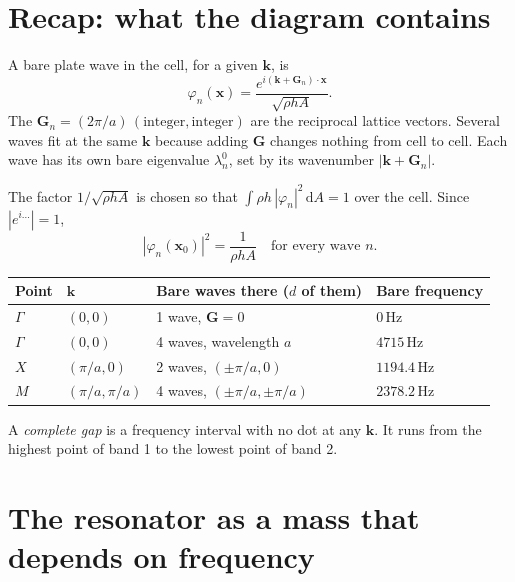\section{Recap: what the diagram contains}

A bare plate wave in the cell, for a given $\mathbf{k}$, is
\begin{equation}
  \varphi_n(\mathbf{x}) = \frac{e^{i(\mathbf{k}+\mathbf{G}_n)\cdot\mathbf{x}}}{\sqrt{\rho h A}} .
\end{equation}
The $\mathbf{G}_n = (2\pi/a)\,(\text{integer}, \text{integer})$ are the reciprocal
lattice vectors. Several waves fit at the same $\mathbf{k}$ because adding
$\mathbf{G}$ changes nothing from cell to cell. Each wave has its own bare
eigenvalue $\lambda_n^0$, set by its wavenumber $|\mathbf{k}+\mathbf{G}_n|$.

The factor $1/\sqrt{\rho h A}$ is chosen so that
$\int \rho h\,|\varphi_n|^2\,\mathrm{d}A = 1$ over the cell. Since
$|e^{i\dots}| = 1$,
\begin{equation}
  |\varphi_n(\mathbf{x}_0)|^2 = \frac{1}{\rho h A} \quad\text{for every wave } n.
  \label{eq:phi_squared}
\end{equation}

\begin{center}
\begin{tabular}{|l|l|l|l|}
\hline
Point & $\mathbf{k}$ & Bare waves there ($d$ of them) & Bare frequency \\
\hline
$\Gamma$ & $(0,0)$ & 1 wave, $\mathbf{G} = 0$ & $0\,\mathrm{Hz}$ \\
$\Gamma$ & $(0,0)$ & 4 waves, wavelength $a$ & $4715\,\mathrm{Hz}$ \\
$X$ & $(\pi/a, 0)$ & 2 waves, $(\pm\pi/a, 0)$ & $1194.4\,\mathrm{Hz}$ \\
$M$ & $(\pi/a, \pi/a)$ & 4 waves, $(\pm\pi/a, \pm\pi/a)$ & $2378.2\,\mathrm{Hz}$ \\
\hline
\end{tabular}
\end{center}

A \emph{complete gap} is a frequency interval with no dot at any $\mathbf{k}$.
It runs from the highest point of band 1 to the lowest point of band 2.

\section{The resonator as a mass that depends on frequency}


